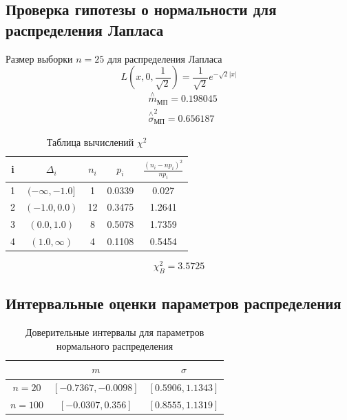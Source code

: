 \documentclass[a4]{article}
\begin{document}
\subsection{Проверка гипотезы о нормальности для распределения \newline  Лапласа}
Размер выборки $ n = 25 $ для распределения Лапласа
\begin{equation}\label{eqn:laplace}
L\left( x,0,\frac{1}{\sqrt{2}}\right) = \frac{1}{\sqrt{2}}e^{-\sqrt{2}\vert x\vert}
\end{equation}
\begin{equation}
\begin{split}
&\overset{\wedge}{m}_{\text{МП}} = 0.198045\\
&  \overset{\wedge}{\sigma}^2_{\text{МП}} = 0.656187
\end{split}
\end{equation}

\begin{table}[H]
	\caption{Таблица вычислений $\chi^2$}
	\label{tab:my_label1}
	\begin{center}
		\vspace{5mm}
		\begin{tabular}{|c|c|c|c|c|}
			\hline
			i & $\Delta_i$ & $n_i$ & $p_i$ & $\frac{(n_i-np_i)^2}{np_i}$\\
			\hline
			1&	 $(-\infty, -1.0]$ &	1  &	 0.0339 &	 0.027\\
			\hline
			2&	$(-1.0, 0.0)$&	12&	 0.3475&	  1.2641\\
			\hline
			3& $(0.0, 1.0)$&	8&	 0.5078&	 1.7359\\
			\hline
			4&	$(1.0, \infty)$&	4&	 0.1108&	 0.5454\\
			\hline
			
			\hline
		\end{tabular}
	\end{center}
\end{table}

$$\chi_B^2 = 3.5725$$ 

\subsection{Интервальные оценки параметров распределения}

\begin{table}[H]
	\caption{Доверительные интервалы для параметров нормального распределения}
	\label{tab:my_label1}
	\begin{center}
		\vspace{5mm}
		\begin{tabular}{|c|c|c|}
			\hline
			& $m$ & $\sigma$\\
			\hline
			$ n = 20 $ &	 $[-0.7367, -0.0098]$ &	$ [0.5906, 1.1343] $\\
			\hline
			$ n = 100 $&	$[-0.0307, 0.356]$ & $ [0.8555, 1.1319] $\\
			\hline
		\end{tabular}
	\end{center}
\end{table}
\end{document}
